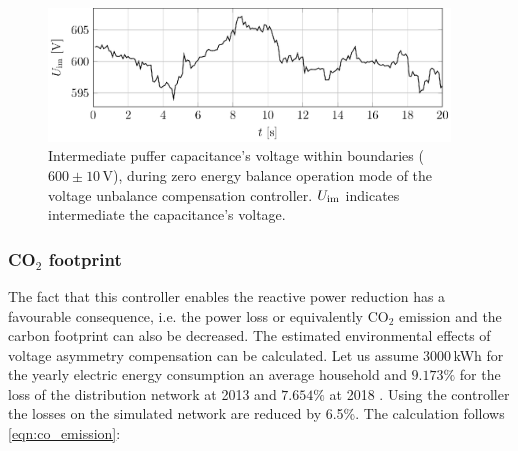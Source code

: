             \begin{figure}[ht]
            \centering
            \includegraphics[width=0.95\textwidth]{Unblance_EPS_Pics/UnbalRedComp_JCP-figure7.eps}
                 \caption{Intermediate puffer capacitance's voltage within boundaries ($600\pm10$\,V), during zero energy balance operation mode of the voltage unbalance compensation controller. $U_{\textnormal{im}}$ indicates intermediate the capacitance's voltage.}
                 \label{fig:u_inter}
                \end{figure}

%

        \subsubsection[CO2 footprint]{CO$_2$ footprint}\label{VUB:sec:CO2}

            The fact that this controller enables the reactive power reduction has a favourable consequence, i.e. the power loss or equivalently CO$_2$ emission and the carbon footprint can also be decreased. The estimated environmental effects of voltage asymmetry compensation can be calculated. Let us assume 3000\,kWh for the yearly electric energy consumption an average household and $9.173\%$ for the loss of the distribution network at 2013 \cite{MVM2013} and $7.654\%$ at 2018 \cite{MVM2018}. Using the controller the losses on the simulated network are reduced by 6.5\%. The calculation follows \ref{eqn:co_emission}:

